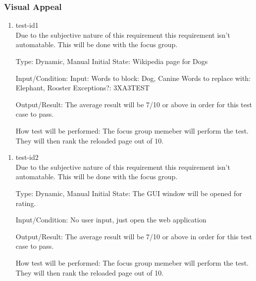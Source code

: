 \documentclass[12pt, titlepage]{article}
\begin{document}
\subsubsection{Visual Appeal}
\begin{enumerate}
\item{test-id1\\}
Due to the subjective nature of this requirement this requirement isn't automatable. This will be done with the focus group.

Type: Dynamic, Manual
Initial State: Wikipedia page for Dogs
					
Input/Condition: Input: Words to block: Dog, Canine
Words to replace with: Elephant, Rooster
Exceptions?: 3XA3TEST
					
Output/Result: The average result will be 7/10 or above in order for this test case to pass.
					
How test will be performed: The focus group memeber will perform the test. They will then rank the reloaded page out of 10.
\end{enumerate}
\begin{enumerate}
\item{test-id2\\}
Due to the subjective nature of this requirement this requirement isn't automatable. This will be done with the focus group.

Type: Dynamic, Manual
Initial State: The GUI window will be opened for rating.
					
Input/Condition: No user input, just open the web application
					
Output/Result: The average result will be 7/10 or above in order for this test case to pass.
					
How test will be performed: The focus group memeber will perform the test. They will then rank the reloaded page out of 10.
\end{enumerate}
\end{document}
